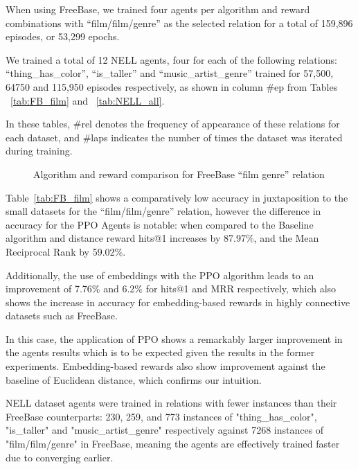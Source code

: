 When using FreeBase, we trained four agents per algorithm and reward combinations with ``film/film/genre'' as the selected relation for a total of 159,896 episodes, or 53,299 epochs.

We trained a total of 12 NELL agents, four for each of the following relations: ``thing\_has\_color'', ``is\_taller'' and ``music\_artist\_genre'' trained for 57,500, 64750 and 115,950 episodes respectively, as shown in column \#ep from Tables ~\ref{tab:FB_film} and ~\ref{tab:NELL_all}.

In these tables, \#rel denotes the frequency of appearance of these relations for each dataset, and \#laps indicates the number of times the dataset was iterated during training.




\begin{figure}[!h]
    \centering
    
    \caption{Algorithm and reward comparison for FreeBase ``film genre'' relation}
    \label{fig:fb_film_genre}
\end{figure}


Table~\ref{tab:FB_film} shows a comparatively low accuracy in juxtaposition to the small datasets for the ``film/film/genre'' relation, however the difference in accuracy for the PPO Agents is notable: when compared to the Baseline algorithm and distance reward hits@1 increases by 87.97\%, and the Mean Reciprocal Rank by 59.02\%.

Additionally, the use of embeddings with the PPO algorithm leads to an improvement of 7.76\% and 6.2\% for hits@1 and MRR respectively, which also shows the increase in accuracy for embedding-based rewards in highly connective datasets such as FreeBase.

In this case, the application of PPO shows a remarkably larger improvement in the agents results which is to be expected given the results in the former experiments. Embedding-based rewards also show improvement against the baseline of Euclidean distance, which confirms our intuition. %



NELL dataset agents were trained in relations with fewer instances than their FreeBase counterparts: 230, 259, and 773 instances of "thing\_has\_color", "is\_taller" and "music\_artist\_genre" respectively against 7268 instances of "film/film/genre" in FreeBase, meaning the agents are effectively trained faster due to converging earlier.

